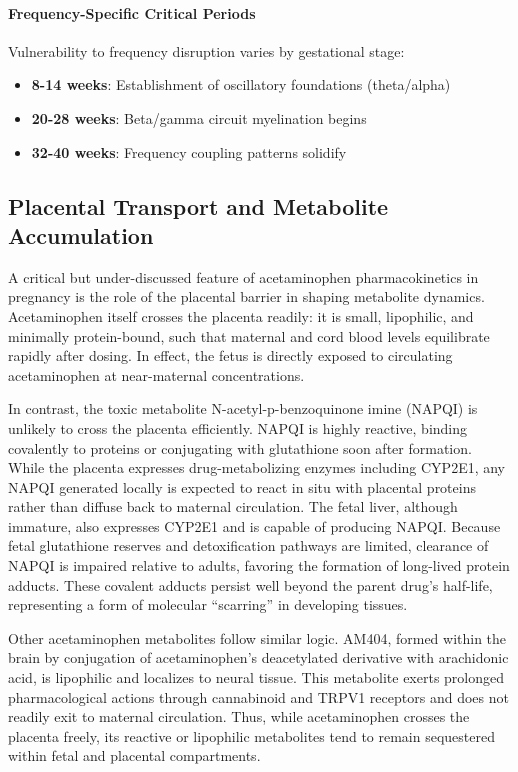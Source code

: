 \documentclass[11pt]{article}
\let\oldsubsection\subsection
\renewcommand{\subsection}[1]{\oldsubsection{#1}\setlength{\leftskip}{0.75em}}
\begin{document}
\paragraph{Frequency-Specific Critical Periods}
Vulnerability to frequency disruption varies by gestational stage:
\begin{itemize}
\item \textbf{8-14 weeks}: Establishment of oscillatory foundations (theta/alpha)
\item \textbf{20-28 weeks}: Beta/gamma circuit myelination begins
\item \textbf{32-40 weeks}: Frequency coupling patterns solidify
\end{itemize}

\subsection{Placental Transport and Metabolite Accumulation}

A critical but under-discussed feature of acetaminophen pharmacokinetics in pregnancy is the role of the placental barrier in shaping metabolite dynamics. Acetaminophen itself crosses the placenta readily: it is small, lipophilic, and minimally protein-bound, such that maternal and cord blood levels equilibrate rapidly after dosing. In effect, the fetus is directly exposed to circulating acetaminophen at near-maternal concentrations.

In contrast, the toxic metabolite N-acetyl-p-benzoquinone imine (NAPQI) is unlikely to cross the placenta efficiently. NAPQI is highly reactive, binding covalently to proteins or conjugating with glutathione soon after formation. While the placenta expresses drug-metabolizing enzymes including CYP2E1, any NAPQI generated locally is expected to react in situ with placental proteins rather than diffuse back to maternal circulation. The fetal liver, although immature, also expresses CYP2E1 and is capable of producing NAPQI. Because fetal glutathione reserves and detoxification pathways are limited, clearance of NAPQI is impaired relative to adults, favoring the formation of long-lived protein adducts. These covalent adducts persist well beyond the parent drug's half-life, representing a form of molecular ``scarring'' in developing tissues.

Other acetaminophen metabolites follow similar logic. AM404, formed within the brain by conjugation of acetaminophen's deacetylated derivative with arachidonic acid, is lipophilic and localizes to neural tissue. This metabolite exerts prolonged pharmacological actions through cannabinoid and TRPV1 receptors and does not readily exit to maternal circulation. Thus, while acetaminophen crosses the placenta freely, its reactive or lipophilic metabolites tend to remain sequestered within fetal and placental compartments.
\end{document}

